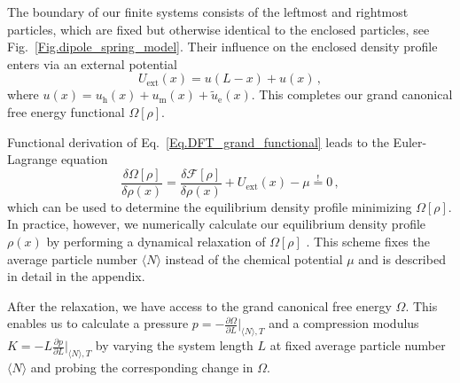 \documentclass[aps,pre,twocolumn,superscriptaddress,nofootinbib]{revtex4}
\begin{document}
The boundary of our finite systems consists of the leftmost and rightmost particles, which are fixed but otherwise identical to the enclosed particles, see Fig.~\ref{Fig.dipole_spring_model}.
Their influence on the enclosed density profile enters via an external potential
%
\begin{equation}
	U_\textrm{ext}(x) = u(L - x) + u(x) \, ,
	\label{Eq.DFT_external_potential}
\end{equation}
%
where $u(x) = u_\textrm{h}(x) + u_\textrm{m}(x) + \tilde{u}_\textrm{e}(x)$.
This completes our grand canonical free energy functional $\Omega[\rho]$. 

Functional derivation of Eq.~\eqref{Eq.DFT_grand_functional} leads to the Euler-Lagrange equation
%
\begin{equation}
	\frac{\delta \Omega[\rho]}{\delta \rho(x)} = \frac{\delta \mathcal{F}[\rho]}{\delta \rho(x)} + U_\textrm{ext}(x) - \mu \overset{!}{=} 0 \, , 
	\label{Eq.DFT_Euler-Lagrange}
\end{equation}
%
which can be used to determine the equilibrium density profile minimizing $\Omega[\rho]$.
In practice, however, we numerically calculate our equilibrium density profile $\rho(x)$ by performing a dynamical relaxation of $\Omega[\rho]$ \cite{Loewen1993_JChemPhys}. 
This scheme fixes the average particle number $\langle N \rangle$ instead of the chemical potential $\mu$ and is described in detail in the appendix. 

After the relaxation, we have access to the grand canonical free energy $\Omega$. 
This enables us to calculate a pressure $p = -\frac{\partial \Omega}{\partial L}\big\vert_{\langle N \rangle, T}$ and a compression modulus $K = -L \frac{\partial p}{\partial L}\big\vert_{\langle N \rangle, T}$
by varying the system length $L$ at fixed average particle number $\langle N \rangle$ and probing the corresponding change in $\Omega$. 
\end{document}
